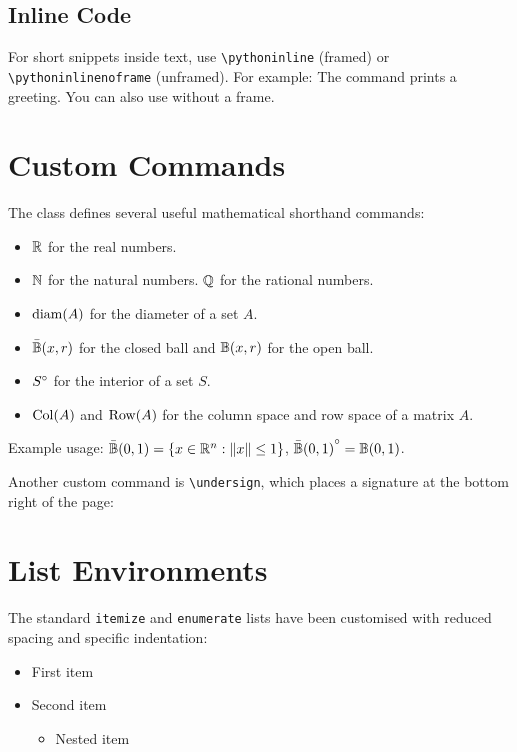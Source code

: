 \documentclass{myBook}
\begin{document}
\section{Inline Code}
For short snippets inside text, use \texttt{\textbackslash pythoninline} (framed) or \texttt{\textbackslash pythoninlinenoframe} (unframed). For example:
The command  prints a greeting. You can also use  without a frame.

\chapter{Custom Commands}
The class defines several useful mathematical shorthand commands:

\begin{itemize}
    \item $\mathbb{R}$ for the real numbers.
    \item $\mathbb{N}$ for the natural numbers.
    $\mathbb{Q}$ for the rational numbers.
    \item $\operatorname{diam}(A)$ for the diameter of a set $A$.
    \item $\bar{\mathbb{B}}(x,r)$ for the closed ball and $\mathbb{B}(x,r)$ for the open ball.
    \item ${S}^{\circ}$ for the interior of a set $S$.
    \item $\operatorname{Col}(A)$ and $\operatorname{Row}(A)$ for the column space and row space of a matrix $A$.
\end{itemize}

Example usage: $\bar{\mathbb{B}}(0,1) = \{x \in \mathbb{R}^n : \|x\| \le 1\}$, ${\bar{\mathbb{B}}(0,1)}^{\circ} = \mathbb{B}(0,1)$.

Another custom command is \texttt{\textbackslash undersign}, which places a signature at the bottom right of the page:
\undersign

\chapter{List Environments}
The standard \texttt{itemize} and \texttt{enumerate} lists have been customised with reduced spacing and specific indentation:
\begin{itemize}
    \item First item
    \item Second item
        \begin{itemize}
            \item Nested item
        \end{itemize}
\end{itemize}
\end{document}
